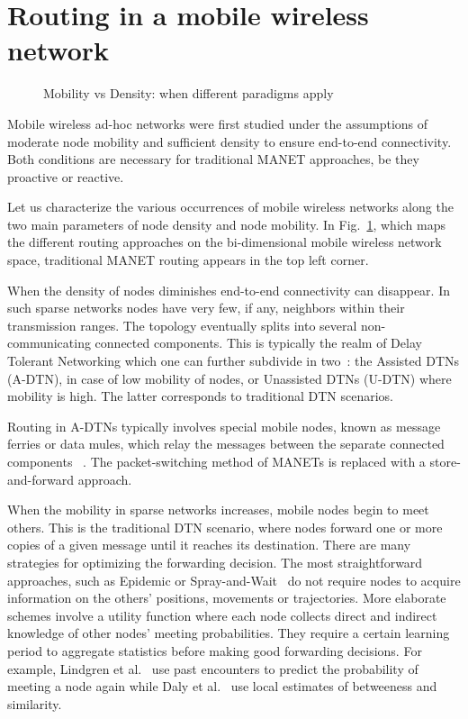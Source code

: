 \documentclass[10pt,twocolumn,letterpaper]{article}
\begin{document}
\section{Routing in a mobile wireless network}
\label{comparison}
\begin{figure}
  \centering
  \caption{Mobility vs Density: when different paradigms apply}
  \label{mod_density}
\end{figure}

Mobile wireless ad-hoc networks were first studied under the
assumptions of moderate node mobility and sufficient density to ensure
end-to-end connectivity. Both conditions are necessary for traditional
MANET approaches, be they proactive 
or reactive.

Let us characterize the various occurrences of mobile wireless networks
along the two main parameters of node density and node mobility. In
Fig.~\ref{mod_density}, which maps the different routing approaches on
the bi-dimensional mobile wireless network space, traditional MANET
routing appears in the top left corner.

When the density of nodes diminishes end-to-end connectivity can
disappear.  In such sparse networks nodes have very few, if any,
neighbors within their transmission ranges. The topology eventually
splits into several non-communicating connected components.  This is
typically the realm of Delay Tolerant Networking which one can further
subdivide in two~\cite{BorrelAmmar07}: the Assisted DTNs (A-DTN), in
case of low mobility of nodes, or Unassisted DTNs (U-DTN) where
mobility is high. The latter corresponds to traditional DTN scenarios.

Routing in A-DTNs typically involves special mobile
nodes, known as message ferries or data mules, which relay the messages
between the separate connected components
~\cite{ZA-ACMMOBIHOC2004,Shah2003}. The packet-switching method of
MANETs is replaced with a store-and-forward approach.

When the mobility in sparse networks increases, mobile nodes begin to
meet others. This is the traditional DTN scenario, where nodes forward
one or more copies of a given message until it reaches its
destination. There are many strategies for optimizing the forwarding
decision. The most straightforward approaches, such as Epidemic or
Spray-and-Wait~\cite{spyro_sw} do not require nodes to acquire
information on the others' positions, movements or trajectories.  More
elaborate schemes involve a utility function where each node collects
direct and indirect knowledge of other nodes' meeting
probabilities. They require a certain learning period to aggregate
statistics before making good forwarding decisions. For example,
Lindgren et al.~\cite{lindgren03} use past encounters to predict the
probability of meeting a node again while Daly et al.~\cite{daly07}
use local estimates of betweeness and similarity.
\end{document}
